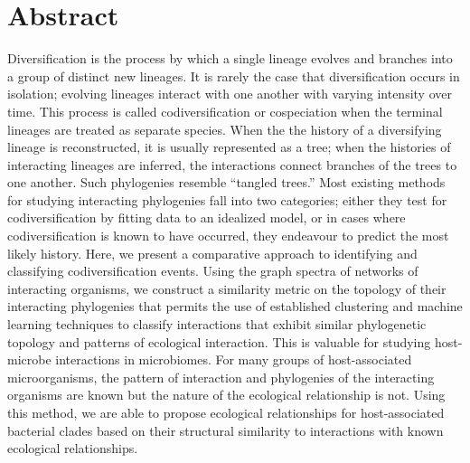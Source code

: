 \section{Abstract}

Diversification is the process by which a single lineage evolves and branches into a group of distinct new lineages. It is rarely the case that diversification occurs in isolation; evolving lineages interact with one another with varying intensity over time. This process is called codiversification or cospeciation when the terminal lineages are treated as separate species. When the the history of a diversifying lineage is reconstructed, it is usually represented as a tree; when the histories of interacting lineages are inferred, the interactions connect branches of the trees to one another. Such phylogenies resemble ``tangled trees.'' Most existing methods for studying interacting phylogenies fall into two categories; either they test for codiversification by fitting data to an idealized model, or in cases where codiversification is known to have occurred, they endeavour to predict the most likely history. Here, we present a comparative approach to identifying and classifying codiversification events. Using the graph spectra of networks of interacting organisms, we construct a similarity metric on the topology of their interacting phylogenies that permits the use of established clustering and machine learning techniques to classify interactions that exhibit similar phylogenetic topology and patterns of ecological interaction. This is valuable for studying host-microbe interactions in microbiomes. For many groups of host-associated microorganisms, the pattern of interaction and phylogenies of the interacting organisms are known but the nature of the ecological relationship is not. Using this method, we are able to propose ecological relationships for host-associated bacterial clades based on their structural similarity to interactions with known ecological relationships.